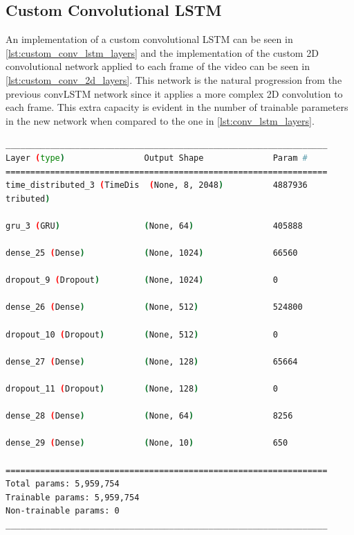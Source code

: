 \subsection{Custom Convolutional LSTM}

An implementation of a custom convolutional LSTM can be seen in \cref{lst:custom_conv_lstm_layers} and the implementation of the custom 2D convolutional network applied to each frame of the video can be seen in \cref{lst:custom_conv_2d_layers}. This network is the natural progression from the previous convLSTM network since it applies a more complex 2D convolution to each frame. This extra capacity is evident in the number of trainable parameters in the new network when compared to the one in \cref{lst:conv_lstm_layers}.

\begin{lstlisting}[language=Bash,caption={Overview of layers in Custom Convolutional LTSM network.},label={lst:custom_conv_lstm_layers},numbers=none,float=htb]
_________________________________________________________________
Layer (type)                Output Shape              Param #   
=================================================================
time_distributed_3 (TimeDis  (None, 8, 2048)          4887936   
tributed)                                                       
                                                                
gru_3 (GRU)                 (None, 64)                405888    
                                                                
dense_25 (Dense)            (None, 1024)              66560     
                                                                
dropout_9 (Dropout)         (None, 1024)              0         
                                                                
dense_26 (Dense)            (None, 512)               524800    
                                                                
dropout_10 (Dropout)        (None, 512)               0         
                                                                
dense_27 (Dense)            (None, 128)               65664     
                                                                
dropout_11 (Dropout)        (None, 128)               0         
                                                                
dense_28 (Dense)            (None, 64)                8256      
                                                                
dense_29 (Dense)            (None, 10)                650       
                                                                
=================================================================
Total params: 5,959,754
Trainable params: 5,959,754
Non-trainable params: 0
_________________________________________________________________
\end{lstlisting}

